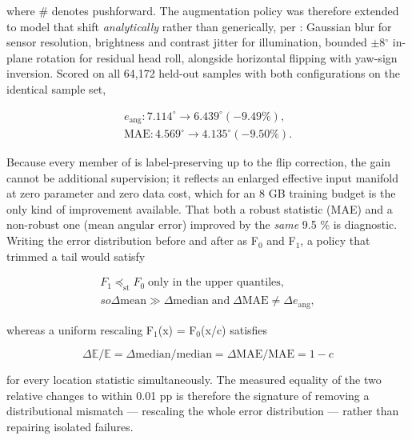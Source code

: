 where \# denotes pushforward. The augmentation policy  was therefore extended to model that shift \emph{analytically} rather than generically, per : Gaussian blur for sensor resolution, brightness and contrast jitter for illumination, bounded $\pm$8$^{\circ}$ in-plane rotation for residual head roll, alongside horizontal flipping with yaw-sign inversion. Scored on all 64,172 held-out samples with both configurations on the identical sample set,

\begin{equation}
\label{eq:186}
\begin{aligned}
e_{\mathrm{ang}}: 7.114^{\circ}  \to 6.439^{\circ} ( -9.49 \% ) , \\
\mathrm{MAE}: 4.569^{\circ}  \to 4.135^{\circ} ( -9.50 \% ) .
\end{aligned}
\end{equation}

Because every member of  is label-preserving up to the flip correction, the gain cannot be additional supervision; it reflects an enlarged effective input manifold at zero parameter and zero data cost, which for an 8 GB training budget is the only kind of improvement available. That both a robust statistic (MAE) and a non-robust one (mean angular error) improved by the \emph{same} 9.5 \% is diagnostic. Writing the error distribution before and after as F$_{0}$ and F$_{1}$, a policy that trimmed a tail would satisfy

\begin{equation}
\label{eq:187}
\begin{aligned}
F_{1} \preceq _{\mathrm{st}} F_{0} \;\text{only in the upper quantiles}, \\
so \Delta \mathrm{mean} \gg \Delta \mathrm{median} \;\text{and}\; \Delta \mathrm{MAE} \neq \Delta e_{\mathrm{ang}} ,
\end{aligned}
\end{equation}

whereas a uniform rescaling F$_{1}$(x) = F$_{0}$(x/c) satisfies

\begin{equation}
\label{eq:188}
\Delta \mathbb{E} / \mathbb{E} = \Delta \mathrm{median} / \mathrm{median} = \Delta \mathrm{MAE} / \mathrm{MAE} = 1 - c
\end{equation}

for every location statistic simultaneously. The measured equality of the two relative changes to within 0.01 pp is therefore the signature of removing a distributional mismatch --- rescaling the whole error distribution --- rather than repairing isolated failures.

